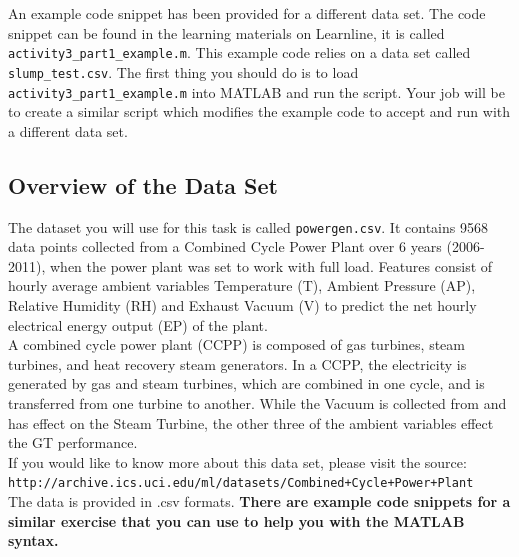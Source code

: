 \documentclass[12pt]{article}
\begin{document}
An example code snippet has been provided for a different data set. The code snippet can be found in the learning materials on Learnline, it is called \verb|activity3_part1_example.m|. This example code relies on a data set called \verb|slump_test.csv|. The first thing you should do is to load \verb|activity3_part1_example.m| into MATLAB and run the script. Your job will be to create a similar script which modifies the example code to accept and run with a different data set.

\subsection*{Overview of the Data Set}
The dataset you will use for this task is called \verb|powergen.csv|. It contains 9568 data points collected from a Combined Cycle Power Plant over 6 years (2006-2011), when the power plant was set to work with full load. Features consist of hourly average ambient variables Temperature (T), Ambient Pressure (AP), Relative Humidity (RH) and Exhaust Vacuum (V) to predict the net hourly electrical energy output (EP)  of the plant.\\

A combined cycle power plant (CCPP) is composed of gas turbines, steam turbines, and heat recovery steam generators. In a CCPP, the electricity is generated by gas and steam turbines, which are combined in one cycle, and is transferred from one turbine to another. While the Vacuum is collected from and has effect on the Steam Turbine, the other three of the ambient variables effect the GT performance.\\

If you would like to know more about this data set, please visit the source:\\

\verb|http://archive.ics.uci.edu/ml/datasets/Combined+Cycle+Power+Plant|\\

The data is provided in .csv formats. \textbf{There are example code snippets for a similar exercise that you can use to help you with the MATLAB syntax.}
\end{document}
